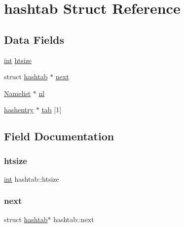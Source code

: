 \hypertarget{structhashtab}{}\section{hashtab Struct Reference}
\label{structhashtab}
\subsection*{Data Fields}
\begin{DoxyCompactItemize}
\item 
\hyperlink{lp__lib_8h_adeb9ec6400320e4923ac9d836d509ddb}{int} \hyperlink{structhashtab_a2d08cab04c412f48bd7b0d189a470222}{htsize}
\item 
struct \hyperlink{structhashtab}{hashtab} $\ast$ \hyperlink{structhashtab_a529da0c432227dae31f051e65c525f5b}{next}
\item 
\hyperlink{struct_namelist}{Namelist} $\ast$ \hyperlink{structhashtab_af14dc732fbff5fa35455057f623d61db}{nl}
\item 
\hyperlink{structhashentry}{hashentry} $\ast$ \hyperlink{structhashtab_a8d4ae557e2e7cea71eb89e7c9af5060e}{tab} \mbox{[}1\mbox{]}
\end{DoxyCompactItemize}


\subsection{Field Documentation}
\mbox{\label{structhashtab_a2d08cab04c412f48bd7b0d189a470222}} 
\subsubsection{\texorpdfstring{htsize}{htsize}}
{\footnotesize\ttfamily \hyperlink{lp__lib_8h_adeb9ec6400320e4923ac9d836d509ddb}{int} hashtab\+::htsize}

\mbox{\label{structhashtab_a529da0c432227dae31f051e65c525f5b}} 
\subsubsection{\texorpdfstring{next}{next}}
{\footnotesize\ttfamily struct \hyperlink{structhashtab}{hashtab}$\ast$ hashtab\+::next}

\mbox{\label{structhashtab_af14dc732fbff5fa35455057f623d61db}} 
